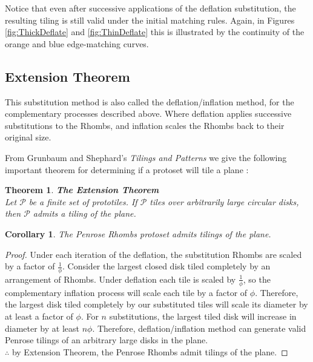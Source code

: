 \documentclass[
  oneside,
  11pt, a4paper,
  footinclude=true,
  headinclude=true,
  cleardoublepage=empty
]{scrbook}
\newtheorem{mythm}{Theorem}
\newtheorem{mycor}{Corollary}
\begin{document}
Notice that even after successive applications of the deflation substitution, the resulting tiling is still valid under the initial matching rules. Again, in Figures \ref{fig:ThickDeflate} and \ref{fig:ThinDeflate} this is illustrated by the continuity of the orange and blue edge-matching curves.

\subsection{Extension Theorem}
This substitution method is also called the deflation/inflation method, for the complementary processes described above. Where deflation applies successive substitutions to the Rhombs, and inflation scales the Rhombs back to their original size.

From Grunbaum and Shephard's \textit{Tilings and Patterns} we give the following important theorem for determining if a protoset will tile a plane \cite{Grunbaum1986}:
\begin{mythm}
\textbf{The Extension Theorem\\}
Let $\mathcal{P}$ be a finite set of prototiles. If $\mathcal{P}$ tiles over arbitrarily large circular disks, then $\mathcal{P}$ admits a tiling of the plane. \cite{Grunbaum1986,Ross}
\end{mythm}

\begin{mycor}
The Penrose Rhombs protoset admits tilings of the plane.
\end{mycor}

\begin{proof}
Under each iteration of the deflation, the substitution Rhombs are scaled by a factor of $\frac{1}{\phi}$. Consider the largest closed disk tiled completely by an arrangement of Rhombs. Under deflation each tile is scaled by  $\frac{1}{\phi}$, so the complementary inflation process will scale each tile by a factor of $\phi$. Therefore, the largest disk tiled completely by our substituted tiles will scale its diameter by at least a factor of $\phi$. For $n$ substitutions, the largest tiled disk will increase in diameter by at least $n\phi$. Therefore, deflation/inflation method can generate valid Penrose tilings of an arbitrary large disks in the plane.\\
$\therefore$ by Extension Theorem, the Penrose Rhombs admit tilings of the plane. 
\end{proof}
\end{document}
